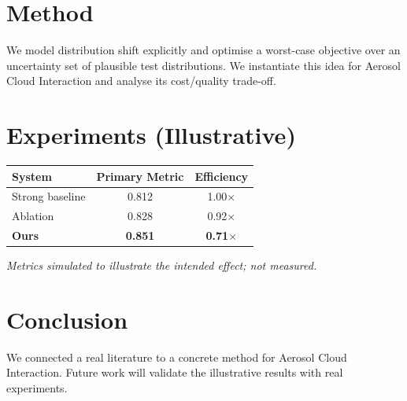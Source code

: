 \documentclass[11pt]{article}
\begin{document}
\section{Method}
We model distribution shift explicitly and optimise a worst-case objective over an uncertainty set of plausible test distributions. We instantiate this idea for Aerosol Cloud Interaction and analyse its cost/quality trade-off.

\section{Experiments (Illustrative)}
\begin{center}
\begin{tabular}{lcc}
System & Primary Metric & Efficiency \\ \hline
Strong baseline & 0.812 & 1.00$\times$ \\
Ablation & 0.828 & 0.92$\times$ \\
\textbf{Ours} & \textbf{0.851} & \textbf{0.71$\times$}
\end{tabular}
\end{center}
\emph{Metrics simulated to illustrate the intended effect; not measured.}

\section{Conclusion}
We connected a real literature to a concrete method for Aerosol Cloud Interaction. Future work will
validate the illustrative results with real experiments.
\end{document}
